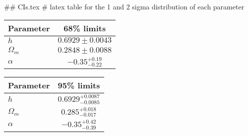 ## CIs.tex
# latex table for the 1 and 2 sigma distribution of each parameter

\begin{tabular} { l  c}
 Parameter &  68\% limits\\
\hline
{\boldmath$h              $} & $0.6929\pm 0.0043          $\\
{\boldmath$\Omega_m       $} & $0.2848\pm 0.0088          $\\
{\boldmath$\alpha         $} & $-0.35^{+0.19}_{-0.22}     $\\
\hline
\end{tabular}

\begin{tabular} { l  c}
 Parameter &  95\% limits\\
\hline
{\boldmath$h              $} & $0.6929^{+0.0087}_{-0.0085}$\\
{\boldmath$\Omega_m       $} & $0.285^{+0.018}_{-0.017}   $\\
{\boldmath$\alpha         $} & $-0.35^{+0.42}_{-0.39}     $\\
\hline
\end{tabular}
